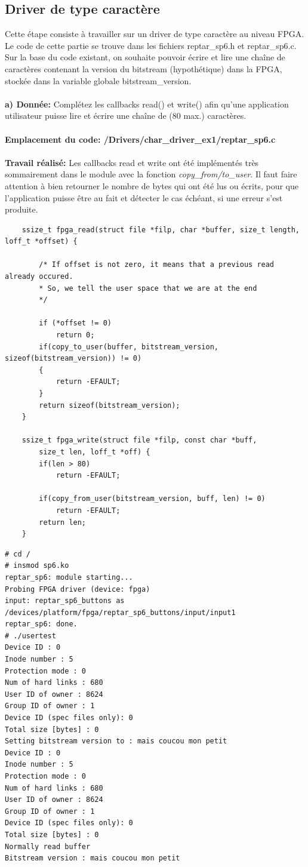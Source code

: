 \subsection{Driver de type caractère}
Cette étape consiste à travailler sur un driver de type caractère au niveau FPGA. Le code de cette
partie se trouve dans les fichiers reptar\_sp6.h et reptar\_sp6.c.
Sur la base du code existant, on souhaite pouvoir écrire et lire une chaîne de caractères contenant la
version du bitstream (hypothétique) dans la FPGA, stockée dans la variable globale bitstream\_version.\\\\
\textbf{a) Donnée: }Complétez les callbacks read() et write() afin qu'une application utilisateur puisse lire et écrire une
chaîne de (80 max.) caractères. \\\\
\textbf{Emplacement du code: /Drivers/char\_driver\_ex1/reptar\_sp6.c}\\\\
\textbf{Travail réalisé: }Les callbacks read et write ont été implémentés très sommairement dans le module avec la fonction 
\textit{copy\_from/to\_user}. Il faut faire attention à bien retourner le nombre de bytes qui ont été lus ou écrits, pour que l'application puisse être au fait et détecter le cas échéant, si une erreur s'est produite.\\

\begin{lstlisting}
	ssize_t fpga_read(struct file *filp, char *buffer, size_t length, loff_t *offset) {
		
		/* If offset is not zero, it means that a previous read already occured.
		* So, we tell the user space that we are at the end
		*/
		
		if (*offset != 0)
			return 0;
		if(copy_to_user(buffer, bitstream_version, sizeof(bitstream_version)) != 0)
		{
			return -EFAULT;
		}
		return sizeof(bitstream_version);			
	}
	
	ssize_t fpga_write(struct file *filp, const char *buff, 
		size_t len, loff_t *off) {
		if(len > 80)
			return -EFAULT;
		
		if(copy_from_user(bitstream_version, buff, len) != 0)
			return -EFAULT;
		return len;
	}
\end{lstlisting}

\begin{lstlisting}
# cd /
# insmod sp6.ko 
reptar_sp6: module starting...
Probing FPGA driver (device: fpga)
input: reptar_sp6_buttons as /devices/platform/fpga/reptar_sp6_buttons/input/input1
reptar_sp6: done.
# ./usertest 
Device ID : 0
Inode number : 5
Protection mode : 0
Num of hard links : 680
User ID of owner : 8624
Group ID of owner : 1
Device ID (spec files only): 0
Total size [bytes] : 0
Setting bitstream version to : mais coucou mon petit                                                          
Device ID : 0
Inode number : 5
Protection mode : 0
Num of hard links : 680
User ID of owner : 8624
Group ID of owner : 1
Device ID (spec files only): 0
Total size [bytes] : 0
Normally read buffer
Bitstream version : mais coucou mon petit
\end{lstlisting}

